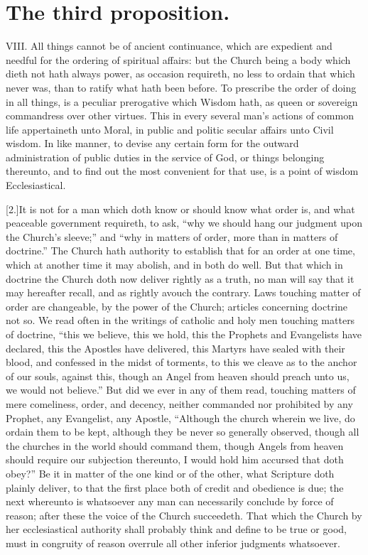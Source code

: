\section*{The third proposition.}
VIII. All things cannot be of ancient continuance, which are expedient and needful for the ordering of spiritual affairs: but the Church being a body which dieth not hath always power, as occasion requireth, no less to ordain that which never was, than to ratify what hath been before. To prescribe the order of doing in all things, is a peculiar prerogative which Wisdom hath, as queen or sovereign commandress over other virtues. This in every several man’s actions of common life appertaineth unto Moral, in public and politic secular affairs unto Civil wisdom. In like manner, to devise any certain form for the outward administration of public duties in the service of God, or things belonging thereunto, and to find out the most convenient for that use, is a point of wisdom Ecclesiastical.

[2.]It is not for a man which doth know or should know what order is, and what peaceable government requireth, to ask, “why we should hang our judgment upon the Church’s sleeve;” and “why in matters of order, more than in matters of doctrine.” The Church hath authority to establish that for an order at one time, which at another time it may abolish, and in both do well. But that which in doctrine the Church doth now deliver rightly as a truth, no man will say that it may hereafter recall, and as rightly avouch the contrary. Laws touching matter of order are changeable, by the power of the Church; articles concerning doctrine not so. We read often in the writings of catholic  and holy men touching matters of doctrine,
 “this we believe, this we hold, this the Prophets and Evangelists have declared, this the Apostles have delivered, this Martyrs have sealed with their blood, and confessed in the midst of torments, to this we cleave as to the anchor of our souls, against this, though an Angel from heaven should preach unto us, we would not believe.” But did we ever in any of them read, touching matters of mere comeliness, order, and decency, neither commanded nor prohibited by any Prophet, any Evangelist, any Apostle, “Although the church wherein we live, do ordain them to be kept, although they be never so generally observed, though all the churches in the world should command them, though Angels from heaven should require our subjection thereunto, I would hold him accursed that doth obey?” Be it in matter of the one kind or of the other, what Scripture doth plainly deliver, to that the first place both of credit and obedience is due; the next whereunto is whatsoever any man can necessarily conclude by force of reason; after these the voice of the Church succeedeth. That which the Church by her ecclesiastical authority shall probably think and define to be true or good, must in congruity of reason overrule all other inferior judgments whatsoever.

